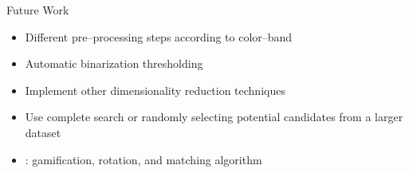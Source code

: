 \begin{frame}{Future Work}
    \begin{itemize}
        \item Different pre--processing steps according to color--band 
        \item Automatic binarization thresholding
        \item Implement other dimensionality reduction techniques
        \item Use complete search or randomly selecting potential candidates from a larger dataset
        \item \mlblinkui: gamification, rotation, and matching algorithm
    \end{itemize}
\end{frame}